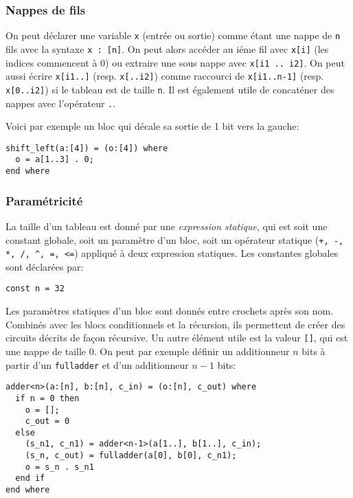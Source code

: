 \documentclass[a4paper]{article}
\begin{document}
\subsubsection*{Nappes de fils}

On peut déclarer une variable \lstinline+x+ (entrée ou sortie) comme étant une nappe de \lstinline+n+ fils avec la syntaxe \lstinline+x : [n]+. On peut alors accéder au iéme fil avec \lstinline+x[i]+ (les indices commencent à 0) ou extraire une sous nappe avec \lstinline+x[i1 .. i2]+. On peut aussi écrire \lstinline+x[i1..]+ (resp. \lstinline+x[..i2]+) comme raccourci de \lstinline+x[i1..n-1]+ (resp. \lstinline+x[0..i2]+) si le tableau est de taille \texttt{n}. Il est également utile de concaténer des nappes avec l'opérateur \lstinline+.+. 

Voici par exemple un bloc qui décale sa sortie de 1 bit vers la gauche:
\begin{lstlisting}
shift_left(a:[4]) = (o:[4]) where
  o = a[1..3] . 0;
end where
\end{lstlisting}


\subsubsection*{Paramétricité}
\label{ref:static}

La taille d'un tableau est donné par une \emph{expression statique}, qui est soit une constant globale, soit un paramètre d'un bloc, soit un opérateur statique (\lstinline{+, -, *, /, ^, =, <=}) appliqué à deux expression statiques. Les constantes globales sont déclarées par:
\begin{lstlisting}
const n = 32
\end{lstlisting}

Les paramètres statiques d'un bloc sont donnés entre crochets après son nom. Combinés avec les blocs conditionnels et la récursion, ils permettent de créer des circuits décrits de façon récursive. Un autre élément utile est la valeur \lstinline+[]+, qui est une nappe de taille 0. On peut par exemple définir un additionneur $n$ bits à partir d'un \texttt{fulladder} et d'un additionneur $n-1$ bits:
\begin{lstlisting}
adder<n>(a:[n], b:[n], c_in) = (o:[n], c_out) where
  if n = 0 then
    o = [];
    c_out = 0
  else
    (s_n1, c_n1) = adder<n-1>(a[1..], b[1..], c_in);
    (s_n, c_out) = fulladder(a[0], b[0], c_n1);
    o = s_n . s_n1
  end if
end where
\end{lstlisting}
\end{document}

